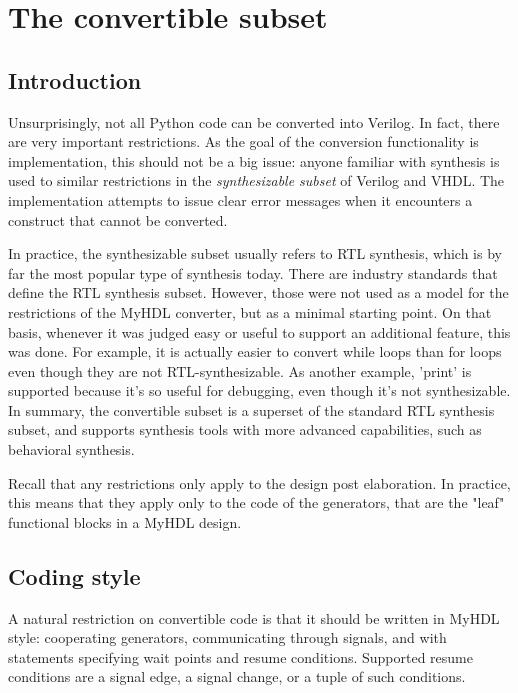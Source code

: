 \documentclass{howto}
\begin{document}
\section{The convertible subset}

\subsection{Introduction}

Unsurprisingly, not all Python code can be converted into Verilog. In
fact, there are very important restrictions.  As the goal of the
conversion functionality is implementation, this should not be a big
issue: anyone familiar with synthesis is used to similar restrictions
in the \emph{synthesizable subset} of Verilog and VHDL. The implementation
attempts to issue clear error messages when it encounters a construct
that cannot be converted. 

In practice, the synthesizable subset usually refers to RTL
synthesis, which is by far the most popular type of synthesis
today. There are industry standards that define the RTL synthesis
subset.  However, those were not used as a model for the restrictions
of the MyHDL converter, but as a minimal starting point.  On that
basis, whenever it was judged easy or useful to support an additional
feature, this was done. For example, it is actually easier to convert
while loops than for loops even though they are not RTL-synthesizable.
As another example, 'print' is supported because it's so useful for
debugging, even though it's not synthesizable.  In summary, the
convertible subset is a superset of the standard RTL synthesis subset,
and supports synthesis tools with more advanced capabilities, such as
behavioral synthesis.

Recall that any restrictions only apply to the design post
elaboration.  In practice, this means that they apply only to the code
of the generators, that are the "leaf" functional blocks in a MyHDL
design.

\subsection{Coding style}

A natural restriction on convertible code is that it should be
written in MyHDL style: cooperating generators, communicating through
signals, and with  statements specifying wait points and resume
conditions.  Supported resume conditions are a signal edge, a signal
change, or a tuple of such conditions.
\end{document}
